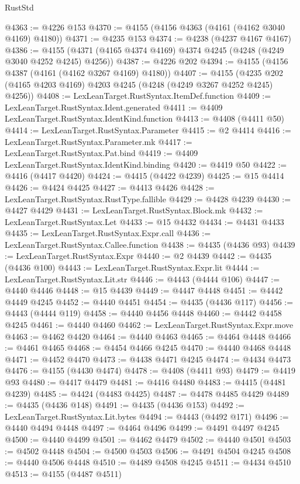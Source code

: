 \begin{lexlean}{RustStd}
\begin{coremodule}
{\begin{coremodule}
{{{{{{{{{{{{{{{{{{{{{{{{{{{{{{{{{{{{{{{{{{{{{{{{{{{{{{{{{{{{@4363 := @4226 @153
@4370 := @4155 (@4156 @4363 (@4161 (@4162 @3040 @4169) @4180))
@4371 := @4235 @153
@4374 := @4238 (@4237 @4167 @4167)
@4386 := @4155 (@4371 (@4165 @4374 @4169) @4374 @4245 (@4248 (@4249 @3040 @4252 @4245) @4256))
@4387 := @4226 @202
@4394 := @4155 (@4156 @4387 (@4161 (@4162 @3267 @4169) @4180))
@4407 := @4155 (@4235 @202 (@4165 @4203 @4169) @4203 @4245 (@4248 (@4249 @3267 @4252 @4245) @4256))
@4408 := LexLeanTarget.RustSyntax.ItemDef.function
@4409 := LexLeanTarget.RustSyntax.Ident.generated
@4411 := @4409 LexLeanTarget.RustSyntax.IdentKind.function
@4413 := @4408 (@4411 @50)
@4414 := LexLeanTarget.RustSyntax.Parameter
@4415 := @2 @4414
@4416 := LexLeanTarget.RustSyntax.Parameter.mk
@4417 := LexLeanTarget.RustSyntax.Pat.bind
@4419 := @4409 LexLeanTarget.RustSyntax.IdentKind.binding
@4420 := @4419 @50
@4422 := @4416 (@4417 @4420)
@4424 := @4415 (@4422 @4239)
@4425 := @15 @4414
@4426 := @4424 @4425
@4427 := @4413 @4426
@4428 := LexLeanTarget.RustSyntax.RustType.fallible
@4429 := @4428 @4239
@4430 := @4427 @4429
@4431 := LexLeanTarget.RustSyntax.Block.mk
@4432 := LexLeanTarget.RustSyntax.Let
@4433 := @15 @4432
@4434 := @4431 @4433
@4435 := LexLeanTarget.RustSyntax.Expr.call
@4436 := LexLeanTarget.RustSyntax.Callee.function
@4438 := @4435 (@4436 @93)
@4439 := LexLeanTarget.RustSyntax.Expr
@4440 := @2 @4439
@4442 := @4435 (@4436 @100)
@4443 := LexLeanTarget.RustSyntax.Expr.lit
@4444 := LexLeanTarget.RustSyntax.Lit.str
@4446 := @4443 (@4444 @106)
@4447 := @4440 @4446
@4448 := @15 @4439
@4449 := @4447 @4448
@4451 := @4442 @4449 @4245
@4452 := @4440 @4451
@4454 := @4435 (@4436 @117)
@4456 := @4443 (@4444 @119)
@4458 := @4440 @4456 @4448
@4460 := @4442 @4458 @4245
@4461 := @4440 @4460
@4462 := LexLeanTarget.RustSyntax.Expr.move
@4463 := @4462 @4420
@4464 := @4440 @4463
@4465 := @4464 @4448
@4466 := @4461 @4465
@4468 := @4454 @4466 @4245
@4470 := @4440 @4468 @4448
@4471 := @4452 @4470
@4473 := @4438 @4471 @4245
@4474 := @4434 @4473
@4476 := @4155 (@4430 @4474)
@4478 := @4408 (@4411 @93)
@4479 := @4419 @93
@4480 := @4417 @4479
@4481 := @4416 @4480
@4483 := @4415 (@4481 @4239)
@4485 := @4424 (@4483 @4425)
@4487 := @4478 @4485 @4429
@4489 := @4435 (@4436 @148)
@4491 := @4435 (@4436 @153)
@4492 := LexLeanTarget.RustSyntax.Lit.bytes
@4494 := @4443 (@4492 @171)
@4496 := @4440 @4494 @4448
@4497 := @4464 @4496
@4499 := @4491 @4497 @4245
@4500 := @4440 @4499
@4501 := @4462 @4479
@4502 := @4440 @4501
@4503 := @4502 @4448
@4504 := @4500 @4503
@4506 := @4491 @4504 @4245
@4508 := @4440 @4506 @4448
@4510 := @4489 @4508 @4245
@4511 := @4434 @4510
@4513 := @4155 (@4487 @4511)
}}}}}}}}}}}}}}}}}}}}}}}}}}}}}}}}}}}}}}}}}}}}}}}}}}}}}}}}}}}}
\end{coremodule}}
\end{coremodule}
\end{lexlean}
